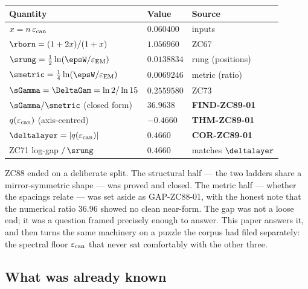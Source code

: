 \documentclass[12pt, a4paper]{article}
\renewcommand{\epsEM}{\varepsilon_{\rm EM}}     %
\renewcommand{\epscan}{\varepsilon_{\rm can}}   %
\begin{document}
\begin{keybox}[title={Numerical Summary --- ZC89 (T-canonical, recomputed)}]
{\small\renewcommand{\arraystretch}{1.25}
\begin{center}
\begin{tabular}{@{}p{6.2cm}p{2.8cm}p{3.4cm}@{}}
\toprule
\textbf{Quantity} & \textbf{Value} & \textbf{Source} \\
\midrule
$x=n\,\epscan$                        & $0.060400$   & inputs \\
$\rborn=(1+2x)/(1+x)$                 & $1.056960$   & ZC67 \\
$\srung=\tfrac12\ln(\epsW/\epsEM)$    & $0.0138834$  & rung (positions) \\
$\smetric=\tfrac14\ln(\epsW/\epsEM)$   & $0.0069246$  & metric (ratio) \\
$\sGamma=\DeltaGam=\ln2/\ln15$        & $0.2559580$  & ZC73 \\
$\sGamma/\smetric$ (closed form)      & $36.9638$    & \textbf{FIND-ZC89-01} \\
$q(\epscan)$ (axis-centred)           & $-0.4660$    & \textbf{THM-ZC89-01} \\
$\deltalayer=|q(\epscan)|$            & $0.4660$     & \textbf{COR-ZC89-01} \\
ZC71 log-gap $/\,\srung$              & $0.4660$     & matches $\deltalayer$ \\
\bottomrule
\end{tabular}
\end{center}}
\end{keybox}

ZC88 ended on a deliberate split. The structural half --- the two ladders
share a mirror-symmetric shape --- was proved and closed. The metric half
--- whether the spacings relate --- was set aside as GAP-ZC88-01, with the
honest note that the numerical ratio $36.96$ showed no clean near-form. The
gap was not a loose end; it was a question framed precisely enough to
answer. This paper answers it, and then turns the same machinery on a
puzzle the corpus had filed separately: the spectral floor $\epscan$ that
never sat comfortably with the other three.

\subsection{What was already known}
\end{document}
